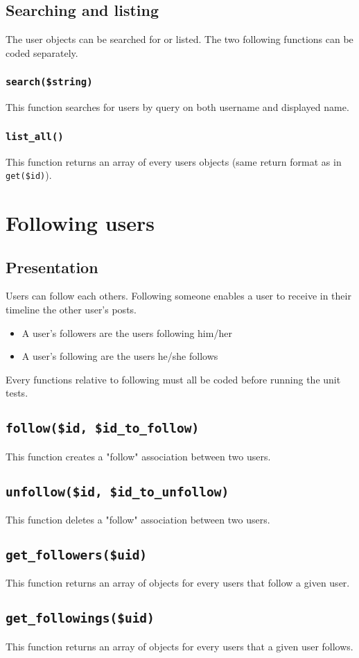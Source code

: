 \documentclass[twoside,a4paper,12pt]{article}
\begin{document}
\subsection{Searching and listing}
The user objects can be searched for or listed. The two following functions can be coded separately.

\subsubsection{\texttt{search(\$string)}}
This function searches for users by query on both username and displayed name.

\subsubsection{\texttt{list\_all()}}
This function returns an array of every users objects (same return format as in \texttt{get(\$id)}).

\section{Following users}

\subsection{Presentation}
Users can follow each others. Following someone enables a user to receive in their timeline the other user's posts.

\begin{itemize}
\item A user's followers are the users following him/her
\item A user's following are the users he/she follows
\end{itemize}

Every functions relative to following must all be coded before running the unit tests. 

\subsection{\texttt{follow(\$id, \$id\_to\_follow)}}
This function creates a "follow" association between two users.

\subsection{\texttt{unfollow(\$id, \$id\_to\_unfollow)}}
This function deletes a "follow" association between two users.

\subsection{\texttt{get\_followers(\$uid)}}
This function returns an array of objects for every users that follow a given user.

\subsection{\texttt{get\_followings(\$uid)}}
This function returns an array of objects for every users that a given user follows.
\end{document}
